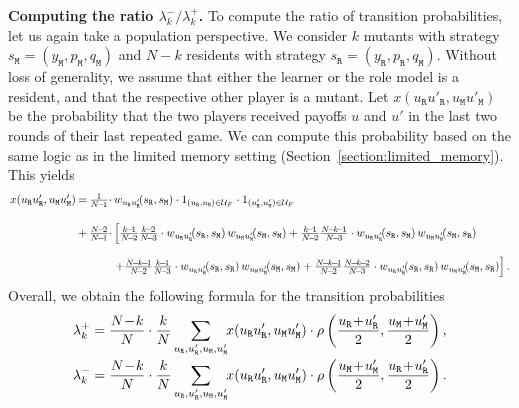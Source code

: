 \documentclass[11pt]{article}
\def\resident{\texttt{R}}
\def\mutant{\texttt{M}}
\def\strategy{s}
\theoremstyle{plainCl1}
\theoremstyle{plainCl2}
\begin{document}
 \noindent
 {\bf Computing the ratio $\lambda^-_k/\lambda^+_k$.}
 To compute the ratio of transition probabilities, let us again take a population perspective. 
 We consider $k$ mutants with strategy $\strategy_\mutant=(y_\mutant,p_\mutant,q_\mutant)$ and $N\!-\!k$ residents with strategy $\strategy_\resident = (y_\resident,p_\resident,q_\mutant)$. 
Without loss of generality, we assume that either the learner or the role model is a resident, and that the respective other player is a mutant. 
Let $x(u_\resident u'_\resident, u_\mutant u'_\mutant)$ be the probability that the two players received payoffs $u$ and $u'$ in the last two rounds of their last repeated game.
We can compute this probability based on the same logic as in the limited memory setting (Section~\ref{section:limited_memory}). 
This yields
\begin{equation*}\label{eq:Chi_TwoRounds} 
\setlength{\arraycolsep}{1pt} 
\begin{array}{llll}
x(u_\resident u'_\resident, u_\mutant u'_\mutant)	 &=
&\frac{1}{N\!-\!1}\cdot  &w_{u_\resident u_\resident'}\!(\strategy_\resident,\strategy_\mutant)\cdot 1_{(u_\resident,u_\mutant)\in \mathcal{U}_F}\cdot 1_{(u'_\resident,u'_\mutant)\in \mathcal{U}_F}\\[0.5cm]
&+	
&\frac{N\!-\!2}{N\!-\!1} \cdot 
&\left[ \frac{k\!-\!1}{N\!-\!2}\frac{k\!-\!2}{N\!-\!3}\cdot w_{u_\resident u_\resident'} \!(\strategy_\resident,\strategy_\mutant) \,w_{u_\mutant u_\mutant'} \!(\strategy_\mutant,\strategy_\mutant) + 
 \frac{k\!-\!1}{N\!-\!2}\frac{N\!-\!k\!-\!1}{N\!-\!3}\cdot w_{u_\resident u_\resident'} \!(\strategy_\resident,\strategy_\mutant) \,w_{u_\mutant u_\mutant'}  \!(\strategy_\mutant,\strategy_\resident)\right.\\[0.5cm]
&&&\left. +\frac{N\!-\!k\!-\!1}{N\!-\!2}\frac{k\!-\!1}{N\!-\!3} \cdot w_{u_\resident u_\resident'} \!(\strategy_\resident,\strategy_\resident) \,w_{u_\mutant u_\mutant'} \!(\strategy_\mutant,\strategy_\mutant) + 
 \frac{N\!-\!k\!-\!1}{N\!-\!2}\frac{N\!-\!k\!-\!2}{N\!-\!3} \cdot w_{u_\resident u_\resident'} \!(\strategy_\resident,\strategy_\resident) \,w_{u_\mutant u_\mutant'}  \!(\strategy_\mutant,\strategy_\resident)\right].
\end{array}
\end{equation*}
Overall, we obtain the following formula for the transition probabilities 
\begin{equation}\label{eq:ratio_TwoRounds}
\begin{array}{l}
\displaystyle \lambda^+_k=\frac{N\!-\!k}{N}\cdot \frac{k}{N} \sum_{u_{\resident},u_\resident',u_{\mutant},u_\mutant'} \hspace{-0.1cm} x(u_\resident u_\resident', u_\mutant u_\mutant')\cdot \rho\left(\frac{u_\resident \!+\! u_\resident'}{2}, \frac{u_\mutant \!+\! u_\mutant '}{2}\right), \\[0.5cm]
\displaystyle \lambda^-_k=\frac{N\!-\!k}{N}\cdot \frac{k}{N} \sum_{u_{\resident},u_\resident',u_{\mutant},u_\mutant'} \hspace{-0.1cm} x(u_\resident u_\resident', u_\mutant u_\mutant')\cdot \rho\left( \frac{u_\mutant \!+\! u_\mutant '}{2}, \frac{u_\resident \!+\! u_\resident'}{2}\right).
\end{array}
\end{equation}
 
\end{document}
